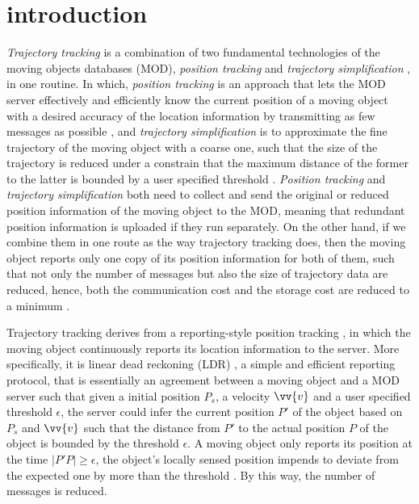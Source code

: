 

\section{introduction}
\label{sec-intro}


\textit{Trajectory tracking} \cite{Lange:Tracking} is a combination of  two fundamental technologies of the moving objects databases (MOD), \textit{position tracking} \cite{Wolfson:PositionTracking,Leonhardi:Comparison} and \textit{trajectory simplification} \cite{Lin:Cised,Zhang:Evaluation}, in one routine. 
In which, \textit{position tracking} is an approach that lets the MOD server effectively and efficiently know the current position of a moving object with a desired accuracy of the location information by transmitting as few messages as possible \cite{Leonhardi:Comparison}, and \textit{trajectory simplification} is to approximate the fine trajectory of the moving object with a coarse one, such that the size of the trajectory is reduced under a constrain that the maximum distance of the former to the latter is bounded by a user specified threshold \cite{Lin:Cised,Zhang:Evaluation}.
\textit{Position tracking} and \textit{trajectory simplification} both need to collect and send the original or reduced position information of the moving object to the MOD, meaning that redundant position information is uploaded if they run separately.
%
On the other hand, if we combine them in one route as the way trajectory tracking does, then the moving object reports only one copy of its position information for both of them, such that not only the number of messages but also the size of trajectory data are reduced, hence, both the communication cost and the storage cost are reduced to a minimum \cite{Lange:Tracking}.

 

Trajectory tracking derives from a reporting-style position tracking \cite{Leonhardi:Comparison}, in which the moving object continuously reports its location information to the server. More specifically, it is linear dead reckoning (LDR) \cite{Leonhardi:Comparison,Civilis:Techniques,Wolfson:PositionTracking}, a simple and efficient reporting protocol, that is essentially an agreement between a moving object and a MOD server such that given a initial position $P_s$, a velocity $\vv{v}$ and a user specified threshold $\epsilon$, the server could infer the current position $P'$ of the object based on $P_s$ and $\vv{v}$ such that the distance from $P'$ to the actual position $P$ of the object is bounded by the threshold $\epsilon$. A moving object only reports its position at the time $|P'P| \ge \epsilon$, \ie the object's locally sensed position impends to deviate from the expected one by more than the threshold \cite{Lange:Tracking}. By this way, the number of messages is reduced.

